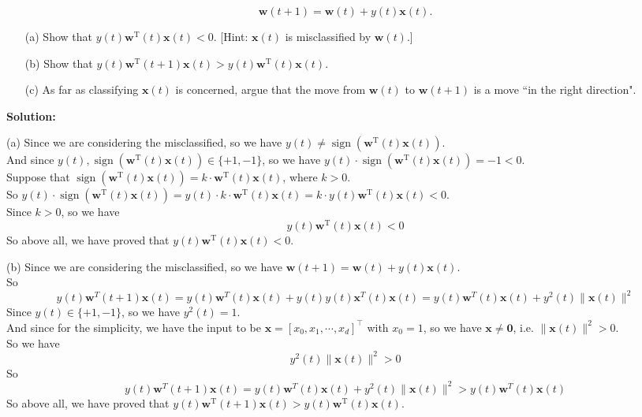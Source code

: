 \documentclass[10pt]{article}
\begin{document}
\begin{enumerate}[1.]
            \begin{equation}
                \mathbf{w}(t+1)=\mathbf{w}(t)+y(t) \mathbf{x}(t).    
            \end{equation}

                
		\begin{itemize}
			\item[(a)] Show that $y(t) \mathbf{w}^{\mathrm{T}}(t) \mathbf{x}(t)<0$. [Hint: $\mathbf{x}(t)$ is misclassified by $\mathbf{w}(t)$.]~ 
			\item[(b)] Show that $y(t) \mathbf{w}^{\mathrm{T}}(t+1) \mathbf{x}(t)>y(t) \mathbf{w}^{\mathrm{T}}(t) \mathbf{x}(t)$.~ 
			\item[(c)]   As far as classifying $\mathbf{x}(t)$ is concerned, argue that the move from $\mathbf{w}(t)$ to $\mathbf{w}(t+1)$ is a move ``in the right direction".~ 
		\end{itemize}

		\textbf{Solution:}
        
(a) Since we are considering the misclassified, so we have $y(t) \neq \operatorname{sign}\left(\mathbf{w}^{\mathrm{T}}(t) \mathbf{x}(t)\right)$.\\
And since $y(t), \operatorname{sign}\left(\mathbf{w}^{\mathrm{T}}(t) \mathbf{x}(t)\right)\in \{+1, -1\}$, so we have $y(t)\cdot\operatorname{sign}\left(\mathbf{w}^{\mathrm{T}}(t)\mathbf{x}(t)\right)=-1<0$.\\
Suppose that $\operatorname{sign}\left(\mathbf{w}^{\mathrm{T}}(t)\mathbf{x}(t)\right)=k\cdot \mathbf{w}^{\mathrm{T}}(t) \mathbf{x}(t)$, where $k>0$.\\
So $y(t)\cdot\operatorname{sign}\left(\mathbf{w}^{\mathrm{T}}(t)\mathbf{x}(t)\right)=y(t)\cdot k\cdot \mathbf{w}^{\mathrm{T}}(t) \mathbf{x}(t)=k\cdot y(t) \mathbf{w}^{\mathrm{T}}(t) \mathbf{x}(t)<0$.\\
Since $k>0$, so we have
$$y(t) \mathbf{w}^{\mathrm{T}}(t) \mathbf{x}(t)<0$$
So above all, we have proved that $y(t) \mathbf{w}^{\mathrm{T}}(t) \mathbf{x}(t)<0$.

(b) Since we are considering the misclassified, so we have $\mathbf{w}(t+1)=\mathbf{w}(t)+y(t) \mathbf{x}(t)$.\\
So
$$y(t)\mathbf{w}^T(t+1)\mathbf{x}(t)=y(t)\mathbf{w}^T(t)\mathbf{x}(t)+y(t)y(t)\mathbf{x}^T(t)\mathbf{x}(t)
=y(t)\mathbf{w}^T(t)\mathbf{x}(t)+y^2(t)\|\mathbf{x}(t)\|^2$$
Since $y(t)\in \{+1, -1\}$, so we have $y^2(t)=1$.\\
And since for the simplicity, we have the input to be $\mathbf{x} = [x_0, x_1, \cdots, x_d]^{\intercal}$ with $x_0=1$, so we have
$\mathbf{x}\neq\mathbf{0}$, i.e. $\|\mathbf{x}(t)\|^2>0$.\\
So we have 
$$y^2(t)\|\mathbf{x}(t)\|^2>0$$
So
$$y(t)\mathbf{w}^T(t+1)\mathbf{x}(t)=y(t)\mathbf{w}^T(t)\mathbf{x}(t)+y^2(t)\|\mathbf{x}(t)\|^2>y(t)\mathbf{w}^T(t)\mathbf{x}(t)$$
So above all, we have proved that $y(t) \mathbf{w}^{\mathrm{T}}(t+1) \mathbf{x}(t)>y(t) \mathbf{w}^{\mathrm{T}}(t) \mathbf{x}(t)$.


\end{enumerate}
\end{document}
